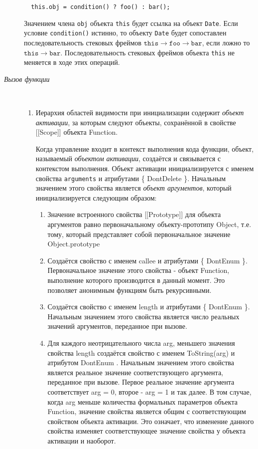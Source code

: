 \begin{description}
\begin{lstlisting}
  this.obj = condition() ? foo() : bar();
\end{lstlisting}

Значением члена \texttt{obj} объекта \texttt{this} будет ссылка на
объект \texttt{Date}. Если условие \texttt{condition()} истинно, то
объекту \texttt{Date} будет сопоставлен последовательность стековых
фреймов $\mathtt{this \rightarrow foo \rightarrow bar}$, если ложно то
$\mathtt{this \rightarrow bar}$. Последовательность стековых фреймов
объекта \texttt{this} не меняется в ходе этих операций.

    \item[\emph{Вызов функции}]~\\  %
      \begin{enumerate}
	\item Иерархия областей видимости при инициализации содержит
	  \emph{объект активации}, за которым следуют объекты,
	  сохранённой в свойстве [[Scope]] объекта Function.

	  Когда управление входит в контекст выполнения кода
	  функции, объект, называемый \emph{объектом активации},
	  создаётся и связывается с контекстом выполнения. Объект
	  активации инициализируется с именем свойства
	  \texttt{arguments} и атрибутами \{ DontDelete \}. Начальным
	  значением этого свойства является \emph{объект аргументов}, 
	  который инициализируется следующим образом: 
	  \begin{enumerate}
	    \item Значение встроенного свойства [[Prototype]] для
	      объекта аргументов равно первоначальному
	      объекту-прототипу Object, т.е. тому, который
	      представляет собой первоначальное значение
	      Object.prototype

	    \item Создаётся свойство с именем callee и атрибутами \{
	      DontEnum \}. Первоначальное значение этого свойства -
	      объект Function, выполнение которого производится в
	      данный момент. Это позволяет анонимным функциям быть
	      рекурсивными.

	    \item Создаётся свойство с именем length и атрибутами \{
	      DontEnum \}. Начальным значением этого свойства является
	      число реальных значений аргументов, переданное при
	      вызове.

	    \item Для каждого неотрицательного числа arg, меньшего
	      значения свойства length создаётся свойство с именем
	      ToString(arg) и атрибутом { DontEnum }. Начальным
	      значением этого свойства является реальное значение
	      соответствующего аргумента, переданное при вызове.
	      Первое реальное значение аргумента соответствует arg =
	      0, второе - arg = 1 и так далее. В том случае, когда arg
	      меньше количества формальных параметров объекта
	      Function, значение свойства является общим с
	      соответствующим свойством объекта активации. Это
	      означает, что изменение данного свойства изменяет
	      соответствующее значение свойства у объекта активации и
	      наоборот.
	  \end{enumerate}


\end{enumerate}
\end{description}
